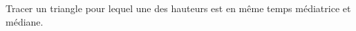 
\begin{exercice}\label{exosmath-0919}

    Tracer un triangle pour lequel une des hauteurs est en même temps médiatrice et médiane.

\end{exercice}
